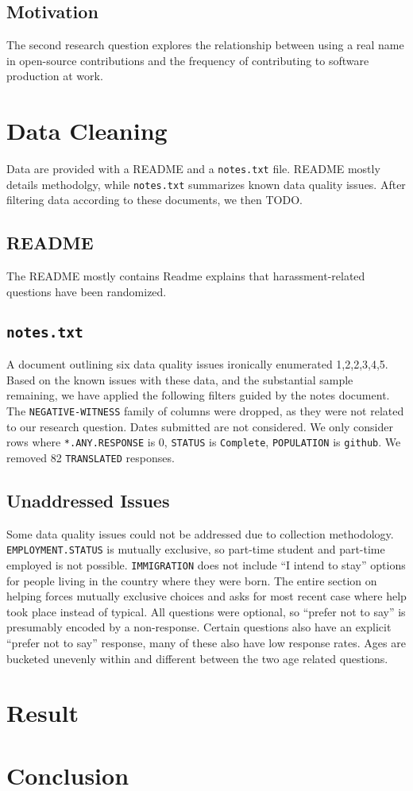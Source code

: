 \documentclass[journal,12pt,onecolumn,]{IEEEtran}
\begin{document}
\subsection{Motivation}

The second research question explores the relationship between using a real name in open-source contributions and the frequency of contributing to software production at work.

\section{Data Cleaning}

Data are provided with a \textsc{README} and a \texttt{notes.txt} file.
\textsc{README} mostly details methodolgy, while \texttt{notes.txt} summarizes known data quality issues.
After filtering data according to these documents, we then TODO.

\subsection{\textsc{README}}

The \textsc{README} mostly contains Readme explains that harassment-related questions have been randomized.

\subsection{\texttt{notes.txt}}

A document outlining six data quality issues ironically enumerated 1,2,2,3,4,5.
Based on the known issues with these data, and the substantial sample remaining, we have applied the following filters guided by the notes document.
The \texttt{NEGATIVE-WITNESS} family of columns were dropped, as they were not related to our research question.
Dates submitted are not considered.
We only consider rows where \texttt{*.ANY.RESPONSE} is 0, \texttt{STATUS} is \texttt{Complete}, \texttt{POPULATION} is \texttt{github}.
We removed 82 \texttt{TRANSLATED} responses.

\subsection{Unaddressed Issues}

Some data quality issues could not be addressed due to collection methodology.
\texttt{EMPLOYMENT.STATUS} is mutually exclusive, so part-time student and part-time employed is not possible.
\texttt{IMMIGRATION} does not include ``I intend to stay'' options for people living in the country where they were born.
The entire section on helping forces mutually exclusive choices and asks for most recent case where help took place instead of typical.
All questions were optional, so ``prefer not to say'' is presumably encoded by a non-response. Certain questions also have an explicit ``prefer not to say'' response, many of these also have low response rates.
Ages are bucketed unevenly within and different between the two age related questions.

\section{Result}


\section{Conclusion}



\end{document}
